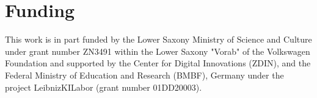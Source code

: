 \documentclass{bioinfo}
\begin{document}



\section*{Funding}
This work is in part funded by the Lower Saxony Ministry of Science and Culture under grant number ZN3491 within the Lower Saxony "Vorab" of the Volkswagen Foundation and supported by the Center for Digital Innovations (ZDIN), and the Federal Ministry of Education and Research (BMBF), Germany under the project LeibnizKILabor (grant number 01DD20003).

\vspace*{-12pt}


\end{document}
